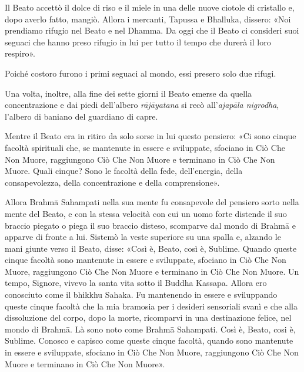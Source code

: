 Il Beato accettò il dolce di riso e il miele in una delle nuove ciotole
di cristallo e, dopo averlo fatto, mangiò. Allora i mercanti, Tapussa e
Bhalluka, dissero: «Noi prendiamo rifugio nel Beato e nel Dhamma. Da
oggi che il Beato ci consideri suoi seguaci che hanno preso rifugio in
lui per tutto il tempo che durerà il loro respiro».


Poiché costoro furono i primi seguaci al mondo, essi presero solo due
rifugi.




 Una volta, inoltre, alla fine dei sette giorni il Beato
emerse da quella concentrazione e dai piedi dell’albero \emph{rājāyatana} si
recò all’\emph{ajapāla nigrodha}, l’albero di baniano del guardiano di capre.


 Mentre il Beato era in ritiro da solo sorse in lui questo
pensiero: «Ci sono cinque facoltà spirituali che, se mantenute in essere
e sviluppate, sfociano in Ciò Che Non Muore, raggiungono Ciò Che Non
Muore e terminano in Ciò Che Non Muore. Quali cinque? Sono le facoltà
della fede, dell’energia, della consapevolezza, della concentrazione e
della comprensione».


\label{pag45}Allora Brahmā Sahampati nella sua mente fu consapevole del pensiero
sorto nella mente del Beato, e con la stessa velocità con cui un uomo
forte distende il suo braccio piegato o piega il suo braccio disteso,
scomparve dal mondo di Brahmā e apparve di fronte a lui. Sistemò la
veste superiore su una spalla e, alzando le mani giunte verso il Beato,
disse: «Così è, Beato, così è, Sublime. Quando queste cinque facoltà
sono mantenute in essere e sviluppate, sfociano in Ciò Che Non Muore,
raggiungono Ciò Che Non Muore e terminano in Ciò Che Non Muore. Un
tempo, Signore, vivevo la santa vita sotto il Buddha Kassapa. Allora ero
conosciuto come il bhikkhu Sahaka. Fu mantenendo in essere e sviluppando
queste cinque facoltà che la mia bramosia per i desideri sensoriali
svanì e che alla dissoluzione del corpo, dopo la morte, ricomparvi in
una destinazione felice, nel mondo di Brahmā. Là sono noto come Brahmā
Sahampati. Così è, Beato, cosi è, Sublime. Conosco e capisco come queste
cinque facoltà, quando sono mantenute in essere e sviluppate, sfociano
in Ciò Che Non Muore, raggiungono Ciò Che Non Muore e terminano in Ciò
Che Non Muore».




